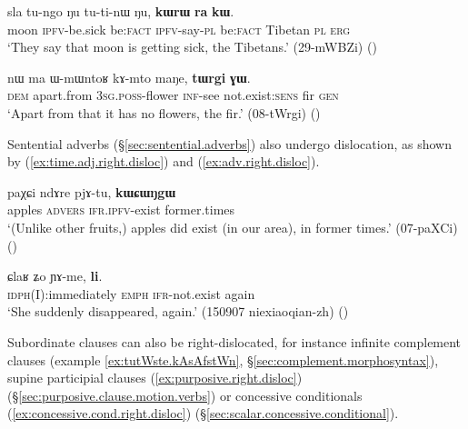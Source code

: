 \begin{exe}
\ex \label{ex:A.right.disloc}
\gll sla tu-ngo ŋu tu-ti-nɯ ŋu, \textbf{kɯrɯ} \textbf{ra} \textbf{kɯ}. \\
moon \textsc{ipfv}-be.sick be:\textsc{fact} \textsc{ipfv}-say-\textsc{pl} be:\textsc{fact} Tibetan \textsc{pl} \textsc{erg} \\
\glt `They say that moon is getting sick, the Tibetans.' (29-mWBZi)
()
\end{exe}


\begin{exe}
\ex \label{ex:possessor.right.disloc}
\gll nɯ ma ɯ-mɯntoʁ kɤ-mto maŋe, \textbf{tɯrgi} \textbf{ɣɯ}. \\
\textsc{dem} apart.from \textsc{3sg}.\textsc{poss}-flower \textsc{inf}-see not.exist:\textsc{sens} fir \textsc{gen} \\
\glt `Apart from that it has no flowers, the fir.' (08-tWrgi)
()
\end{exe}

Sentential adverbs (§\ref{sec:sentential.adverbs}) also undergo dislocation, as shown by (\ref{ex:time.adj.right.disloc}) and (\ref{ex:adv.right.disloc}).

\begin{exe}
\ex \label{ex:time.adj.right.disloc}
\gll paχɕi ndɤre pjɤ-tu, \textbf{kɯɕɯŋgɯ} \\
apples \textsc{advers} \textsc{ifr}.\textsc{ipfv}-exist former.times \\
\glt `(Unlike other fruits,) apples did exist (in our area), in former times.' (07-paXCi)
()
\end{exe}

\begin{exe}
\ex \label{ex:adv.right.disloc}
\gll ɕlaʁ ʑo ɲɤ-me, \textbf{li}. \\
\textsc{idph}(I):immediately \textsc{emph} \textsc{ifr}-not.exist again \\
\glt `She suddenly disappeared, again.' (150907 niexiaoqian-zh)
()
\end{exe}


Subordinate clauses can also be right-dislocated, for instance infinite complement clauses (example \ref{ex:tutWste.kAsAfstWn}, §\ref{sec:complement.morphosyntax}), supine participial clauses (\ref{ex:purposive.right.disloc}) (§\ref{sec:purposive.clause.motion.verbs}) or concessive conditionals (\ref{ex:concessive.cond.right.disloc}) (§\ref{sec:scalar.concessive.conditional}).


